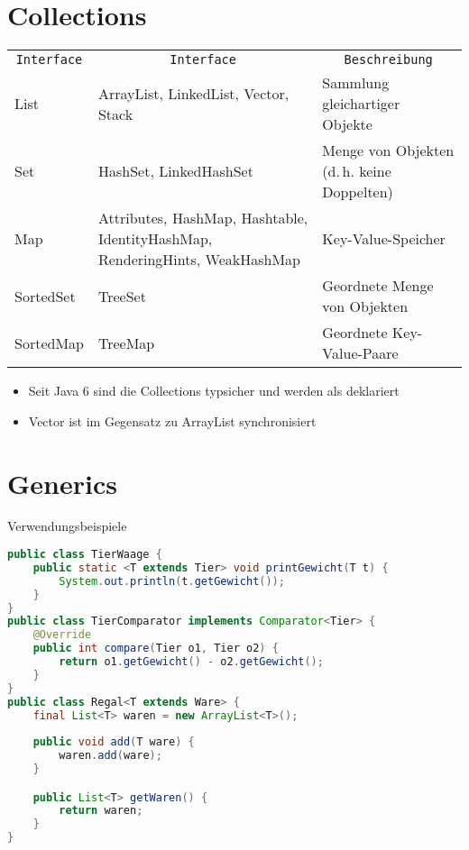 \section{Collections}
\settowidth{\MyLenA}{Interface~}
\settowidth{\MyLenB}{IdentityHashMap,~}
\begin{tabular}{@{}p{\the\MyLenA}%
				@{}p{\the\MyLenA}
				@{}p{\linewidth - \the\MyLenA - \the\MyLenB}
}
\multicolumn{1}{c}{\texttt{Interface}} & \multicolumn{1}{c}{\texttt{Interface}} & \multicolumn{1}{c}{\texttt{Beschreibung}}\\ 
List & ArrayList, LinkedList, Vector, Stack & Sammlung gleichartiger Objekte\\
Set & HashSet, LinkedHashSet & Menge von Objekten (d.\,h. keine Doppelten)\\
Map & Attributes, HashMap, Hashtable, IdentityHashMap, RenderingHints, WeakHashMap & Key-Value-Speicher\\
SortedSet & TreeSet & Geordnete Menge von Objekten\\
SortedMap & TreeMap & Geordnete Key-Value-Paare\\ 
\end{tabular}
\begin{itemize}\itemsep0em
	\item Seit Java 6 sind die Collections typsicher und werden als  deklariert
	\item Vector ist im Gegensatz zu ArrayList synchronisiert
\end{itemize}

\section{Generics}
Verwendungsbeispiele
\begin{lstlisting}[language=Java]
public class TierWaage {
	public static <T extends Tier> void printGewicht(T t) {
		System.out.println(t.getGewicht());
	}
}
public class TierComparator implements Comparator<Tier> {
	@Override
	public int compare(Tier o1, Tier o2) {
		return o1.getGewicht() - o2.getGewicht();
	}
}
public class Regal<T extends Ware> {
	final List<T> waren = new ArrayList<T>();
	
	public void add(T ware) {
		waren.add(ware);
	}

	public List<T> getWaren() {
		return waren;
	}
}
\end{lstlisting}